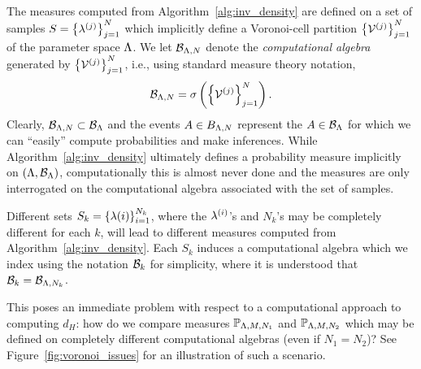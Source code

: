The measures computed from Algorithm~\ref{alg:inv_density} are defined on a set of samples $S = \left\{\lambda^{(j)}\right\}_{j=1}^{N}$ which implicitly define a Voronoi-cell partition $\left\{\mathcal{V}^{(j)}\right\}_{j=1}^{N}$ of the parameter space ${\Lambda}$. 
We let $\mathcal{B}_{{\Lambda}, N}$ denote the \emph{computational algebra} generated by $\left\{\mathcal{V}^{(j)}\right\}_{j=1}^{N}$, i.e., using standard measure theory notation, 
$$
	\mathcal{B}_{{\Lambda},N} = \sigma\left(\left\{\mathcal{V}^{(j)}\right\}_{j=1}^{N}\right).
$$
Clearly, $\mathcal{B}_{{\Lambda}, N}\subset \mathcal{B}_{\Lambda}$ and the events $A\in B_{{\Lambda}, N}$ represent the $A\in\mathcal{B}_{\Lambda}$ for which we can ``easily'' compute probabilities and make inferences.
While Algorithm~\ref{alg:inv_density} ultimately defines a probability measure implicitly on $({\Lambda},\mathcal{B}_{\Lambda})$, computationally this is almost never done and the measures are only interrogated on the computational algebra associated with the set of samples. 

Different sets $S_k = \left\{\lambda{(i)}\right\}_{i=1}^{N_k}$, where the $\lambda^{(i)}$'s and $N_k$'s may be completely different for each $k$, will lead to different measures computed from Algorithm~\ref{alg:inv_density}. 
Each $S_k$ induces a computational algebra which we index using the notation $\mathcal{B}_{k}$ for simplicity, where it is understood that $\mathcal{B}_k = \mathcal{B}_{{\Lambda}, N_k}$. 

This poses an immediate problem with respect to a computational approach to computing $d_H$: how do we compare measures $\mathbb{P}_{{\Lambda}, M, N_1}$ and $\mathbb{P}_{{\Lambda}, M, N_2}$ which may be defined on completely different computational algebras (even if $N_1=N_2$)?
See Figure~\ref{fig:voronoi_issues} for an illustration of such a scenario.

